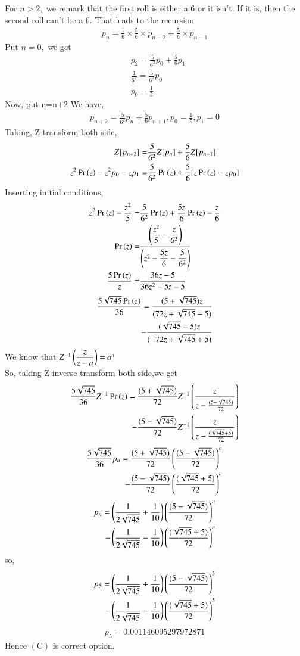 \documentclass[journal,12pt,twocolumn]{IEEEtran}
\begin{document}
For $n>2,$ we remark that the first roll is either a 6 or it isn't. If it is, then the second roll can't be a 6. That leads to the recursion
\begin{align}
p_n=\frac{1}{6} \times \frac{5}{6} \times p_{n-2}+\frac{5}{6} \times p_{n-1}
\end{align}
Put $n=0,$ we get
\begin{align}
&p_2=\frac{5}{6^{2}}p_0+\frac{5}{6}p_1\\
&\frac{1}{6^{2}}=\frac{5}{6^{2}}p_0\\
&p_0=\frac{1}{5}
\end{align}
Now, put n=n+2 
We have,
\begin{align}
p_{n+2}=\frac{5}{6^{2}}p_{n}+\frac{5}{6}p_{n+1},p_0=\frac{1}{5},p_1=0
\end{align}
Taking, Z-transform both side,
\begin{align}
Z[p_{n+2}]=&\frac{5}{6^{2}}Z[p_{n}]+\frac{5}{6}Z[p_{n+1}]\\
z^2\Pr\left(z\right)-z^2p_0-zp_1=&\frac{5}{6^2}\Pr\left(z\right)+\frac{5}{6}[z\Pr\left(z\right)-zp_0]
\end{align}
Inserting initial conditions,
\begin{align}
z^2\Pr\left(z\right)-\frac{z^2}{5}=&\frac{5}{6^2}\Pr\left(z\right)+\frac{5z}{6}\Pr\left(z\right)-\frac{z}{6} \\
\Pr\left(z\right)=&\dfrac{\left(\dfrac{z^2}{5}-\dfrac{z}{6^2}\right)}{\left(z^2-\dfrac{5z}{6}-\dfrac{5}{6^2}\right)}\\
\frac{5\Pr\left(z\right)}{z}=&\frac{36z-5}{36z^2-5z-5}
\end{align}
\begin{align}
\frac{5\sqrt{745}\Pr\left(z\right)}{36}=\frac{(5+\sqrt{745})z}{(72 z+\sqrt{745}-5)}\\
-\frac{(\sqrt{745}-5)z}{(-72 z+\sqrt{745}+5)}
\end{align}
We know that $Z^{-1}\left(\dfrac{z}{z-a}\right)=a^n$\\
So, taking Z-inverse transform both side,we get
\begin{align}
\frac{5\sqrt{745}}{36}Z^{-1}\Pr\left(z\right)=\dfrac{(5+\sqrt{745})}{72}Z^{-1}\left(\frac{z}{z-\frac{(5-\sqrt{745})}{72}}\right)\\
-\frac{(5-\sqrt{745})}{72}Z^{-1}\left(\frac{z}{z-\frac{(\sqrt{745}+5)}{72}}\right)
\end{align}
\begin{align}
\frac{5\sqrt{745}}{36}p_n=\frac{(5+\sqrt{745})}{72}\left(\frac{(5-\sqrt{745})}{72}\right)^{n}\\
-\frac{(5-\sqrt{745})}{72}\left(\frac{(\sqrt{745}+5)}{72}\right)^{n}
\end{align}
\begin{align}
p_n=\left(\frac{1}{2\sqrt{745}}+\frac{1}{10}\right)\left(\frac{(5-\sqrt{745})}{72}\right)^{n}\\
-\left(\frac{1}{2\sqrt{745}}-\frac{1}{10}\right)\left(\frac{(\sqrt{745}+5)}{72}\right)^{n}
\end{align}
so,
\begin{align}
p_5=\left(\frac{1}{2\sqrt{745}}+\frac{1}{10}\right)\left(\frac{(5-\sqrt{745})}{72}\right)^{5}\\
-\left(\frac{1}{2\sqrt{745}}-\frac{1}{10}\right)\left(\frac{(\sqrt{745}+5)}{72}\right)^{5}
\end{align}
\begin{align}
p_5=0.001146095297972871
\end{align}
Hence $(\mathrm{C})$ is correct option.
\end{document}
